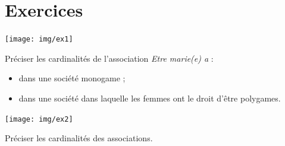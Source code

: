 \documentclass[10pt,firamath,cours]{nsi}
\begin{document}
\section{Exercices}

\begin{exercice}[]
    \begin{center}
    \texttt{[image: img/ex1]}
    \end{center}
    Préciser les cardinalités de l'association \textit{Etre marie(e) a} :
    \begin{itemize}
        \item 	dans une société monogame ;
        \item 	dans une société dans laquelle les femmes ont le droit d'être polygames.
    \end{itemize}
    \end{exercice}
    
    \begin{exercice}[]
    \begin{center}
    \texttt{[image: img/ex2]}
    \end{center}
    Préciser les cardinalités des associations.
    \end{exercice}
    \newpage
    
\end{document}
